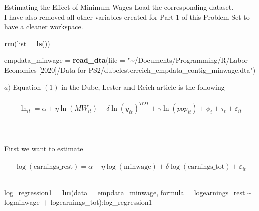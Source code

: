 \documentclass[
  ignorenonframetext,
]{beamer}
\newenvironment{Shaded}{\begin{snugshade}}{\end{snugshade}}
\newcommand{\DataTypeTok}[1]{\textcolor[rgb]{0.13,0.29,0.53}{#1}}
\newcommand{\KeywordTok}[1]{\textcolor[rgb]{0.13,0.29,0.53}{\textbf{#1}}}
\newcommand{\NormalTok}[1]{#1}
\newcommand{\OperatorTok}[1]{\textcolor[rgb]{0.81,0.36,0.00}{\textbf{#1}}}
\newcommand{\StringTok}[1]{\textcolor[rgb]{0.31,0.60,0.02}{#1}}
\begin{document}
\begin{frame}[fragile]{Estimating the Effect of Minimum Wages}
\protect\hypertarget{estimating-the-effect-of-minimum-wages}{}
\hfill\break
\hfill\break
Load the corresponding dataset.\\
I have also removed all other variables created for Part 1 of this
Problem Set to have a cleaner workspace.\\

\begin{Shaded}
\begin{Highlighting}[]
\KeywordTok{rm}\NormalTok{(}\DataTypeTok{list =} \KeywordTok{ls}\NormalTok{())}

\NormalTok{empdata\_minwage =}\StringTok{ }\KeywordTok{read\_dta}\NormalTok{(}\DataTypeTok{file =} \StringTok{"\textasciitilde{}/Documents/Programming/R/Labor Economics [2020]/Data for PS2/dubelesterreich\_empdata\_contig\_minwage.dta"}\NormalTok{)}
\end{Highlighting}
\end{Shaded}

\hfill\break
\hfill\break
\hfill\break

\begin{block}{\(a)\)}
\protect\hypertarget{a-1}{}
\hfill\break
\hfill\break
Equation \((1)\) in the Dube, Lester and Reich article is the
following\\
~\\
\[\ln_{it} = \alpha + \eta\ln(MW_{it}) + \delta\ln(y_{it})^{TOT} + \gamma\ln(pop_{it}) + \phi_i + \tau_t + \varepsilon_{it}\]\\
~\\
~\\
First we want to estimate\\
~\\

\[\log(\textrm{earnings_rest}) = \alpha + \eta\log(\textrm{minwage}) + \delta\log(\textrm{earnings_tot}) + \varepsilon_{it}\]\\

\begin{Shaded}
\begin{Highlighting}[]
\NormalTok{log\_regression1 =}\StringTok{ }\KeywordTok{lm}\NormalTok{(}\DataTypeTok{data =}\NormalTok{ empdata\_minwage, }\DataTypeTok{formula =}\NormalTok{ logearnings\_rest }\OperatorTok{\textasciitilde{}}\StringTok{ }\NormalTok{logminwage }\OperatorTok{+}\StringTok{ }\NormalTok{logearnings\_tot);log\_regression1}
\end{Highlighting}
\end{Shaded}


\end{block}
\end{frame}
\end{document}
